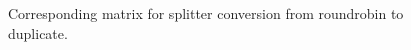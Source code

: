 \begin{figure}
\center
\epsfxsize=3.0in
\caption{Corresponding matrix for splitter conversion from roundrobin to duplicate.}
\label{fig:splitjoin-roundrobin-matrix}
\end{figure}

